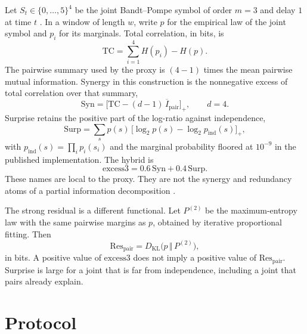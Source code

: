 \documentclass[11pt,a4paper]{article}
\newcommand{\excess}{\mathrm{excess3}}
\newcommand{\Respair}{\mathrm{Res}_{\mathrm{pair}}}
\begin{document}
Let $S_t\in\{0,\ldots,5\}^4$ be the joint Bandt--Pompe symbol of order
$m=3$ and delay $1$ at time $t$ \citep{BandtPompe2002}. In a window of
length $w$, write $p$ for the empirical law of the joint symbol and
$p_i$ for its marginals. Total correlation, in bits, is
\begin{equation}
\mathrm{TC}
=\sum_{i=1}^{4} H(p_i)-H(p).
\end{equation}
The pairwise summary used by the proxy is $(4-1)$ times the mean pairwise
mutual information. Synergy in this construction is the nonnegative excess
of total correlation over that summary,
\begin{equation}
\label{eq:syn}
\mathrm{Syn}
=\bigl[\mathrm{TC}-(d-1)\,\overline{I}_{\mathrm{pair}}\bigr]_+,
\qquad d=4.
\end{equation}
Surprise retains the positive part of the log-ratio against independence,
\begin{equation}
\label{eq:surp}
\mathrm{Surp}
=\sum_{s} p(s)\,
\bigl[\log_2 p(s)-\log_2 p_{\mathrm{ind}}(s)\bigr]_+,
\end{equation}
with $p_{\mathrm{ind}}(s)=\prod_i p_i(s_i)$ and the marginal probability
floored at $10^{-9}$ in the published implementation. The hybrid is
\begin{equation}
\label{eq:excess}
\excess=0.6\,\mathrm{Syn}+0.4\,\mathrm{Surp}.
\end{equation}
These names are local to the proxy. They are not the synergy and
redundancy atoms of a partial information decomposition
\citep{Williams2010}.

The strong residual is a different functional. Let $P^{(2)}$ be the
maximum-entropy law with the same pairwise margins as $p$, obtained by
iterative proportional fitting. Then
\begin{equation}
\label{eq:res}
\Respair
=D_{\mathrm{KL}}\bigl(p\,\Vert\,P^{(2)}\bigr),
\end{equation}
in bits. A positive value of $\excess$ does not imply a positive value of
$\Respair$. Surprise is large for a joint that is far from independence,
including a joint that pairs already explain.

\section{Protocol}
\label{sec:protocol}
\end{document}
